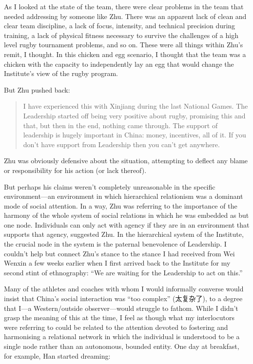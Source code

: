 \begin{CJK}{UTF8}{gbsn}
  As I looked at the state of the team, there were clear problems in the team that needed addressing by someone like Zhu.  There was an apparent lack of clean and clear team discipline, a lack of focus, intensity, and technical precision during training, a lack of physical fitness necessary to survive the challenges of a high level rugby tournament problems, and so on.  These were all things within Zhu's remit, I thought.  In this chicken and egg scenario, I thought that the team was a chicken with the capacity to independently lay an egg that would change the Institute's view of the rugby program.

  But Zhu pushed back:

  \begin{quotation}
    I have experienced this with Xinjiang during the last National Games. The Leadership started off being very positive about rugby, promising this and that, but then in the end, nothing came through.  The support of leadership is hugely important in China: money, incentives, all of it.  If you don't have support from Leadership then you can't get anywhere.
  \end{quotation}

  Zhu was obviously defensive about the situation, attempting to deflect any blame or responsibility for his action (or lack thereof).

  But perhaps his claims weren't completely unreasonable in the specific environment---an environment in which hierarchical relationism was a dominant mode of social attention.  In a way, Zhu was referring to the importance of the harmony of the whole system of social relations in which he was embedded as but one node. Individuals can only act with agency if they are in an environment that supports that agency, suggested Zhu. In the hierarchical system of the Institute, the crucial node in the system is the paternal benevolence of Leadership.  I couldn't help but connect Zhu's stance to the stance I had received from Wei Wenxin a few weeks earlier when I first arrived back to the Institute for my second stint of ethnography: ``We are waiting for the Leadership to act on this.''

  Many of the athletes and coaches with whom I would informally converse would insist that China's social interaction was ``too complex'' (太复杂了), to a degree that I---a Western/outside observer---would struggle to fathom.  While I didn't grasp the meaning of this at the time, I feel as though what my interlocutors were referring to could be related to the attention devoted to fostering and harmonising a relational network in which the individual is understood to be a single node rather than an autonomous, bounded entity. One day at breakfast, for example, Han started dreaming:


\end{CJK}
